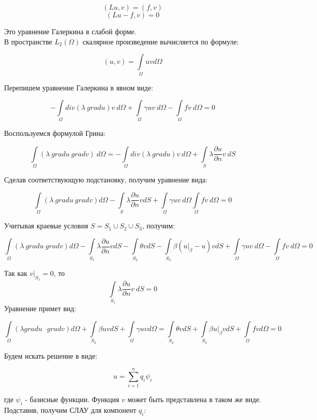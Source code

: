 \documentclass[12pt,a4paper]{article}
\begin{document}
\[ (Lu, v) = (f, v) \]
\[ (Lu - f, v) = 0 \]

\noindent Это уравнение Галеркина в слабой форме. \\
В пространстве $L_2(\Omega)$ скалярное произведение
вычисляется по формуле:

\[ (u, v) = \int \limits_{\Omega} uv d\Omega \]

\noindent Перепишем уравнение Галеркина в явном виде:

\[
    -\int \limits_{\Omega} div(\lambda \ grad u) v \ d\Omega
    +\int \limits_{\Omega} \gamma u v \ d\Omega
    -\int \limits_{\Omega} fv \ d\Omega
    = 0
\]

\noindent Воспользуемся формулой Грина:

\[
    \int \limits_{\Omega} (\lambda \ grad u \ grad v) \ d\Omega
    = -\int \limits_{\Omega} div (\lambda \ grad u) v \ d\Omega
    + \int \limits_S \lambda \frac{\partial u}{\partial n} v \ dS
\]

\noindent Сделав соответствующую подстановку,
получим уравнение вида:

\[
    \int \limits_{\Omega} (\lambda \ grad u \ grad v) d\Omega
    - \int \limits_S \lambda \frac{\partial u}{\partial n} v dS
    + \int \limits_{\Omega} \gamma u v \ d\Omega
    \int \limits_{\Omega} f v \ d\Omega
    = 0
\]

\noindent Учитывая краевые условия  $S=S_1 \cup S_2 \cup S_3$, получим:

\[
    \int \limits_{\Omega} (\lambda \ grad u \ grad v) d\Omega
    - \int \limits_{S_1} \lambda \frac{\partial u}{\partial n} v dS
    - \int \limits_{S_2} \theta v dS
    - \int \limits_{S_3} \beta(u \vert_{\beta} - u) v dS
    + \int \limits_{\Omega} \gamma u v \ d\Omega
    - \int \limits_{\Omega} f v \ d\Omega
    = 0
\]

\noindent Так как $v \vert_{S_1} = 0$, то
\[
    \int \limits_{S_1} \lambda \frac{\partial u}{\partial n} v \ dS = 0
\]
\noindent Уравнение примет вид:

\[
    \int \limits_{\Omega} (\lambda grad u \text{ } grad v) d\Omega
    + \int \limits_{S_3} \beta u v dS
    + \int \limits_{\Omega} \gamma u v d\Omega
    =
    \int \limits_{S_2} \theta v dS
    + \int \limits_{S_3} \beta u \vert_{\beta} v dS
    + \int \limits_{\Omega} f v d\Omega
    = 0
\]

\noindent Будем искать решение в виде:

\[
    u = \sum \limits_{i=1}^n q_i \psi_i
\]

\noindent где $\psi_i$ - базисные функции. Функция $v$ может
быть представлена в таком же виде. Подставив, получим СЛАУ
для компонент $q_i$:
\end{document}
